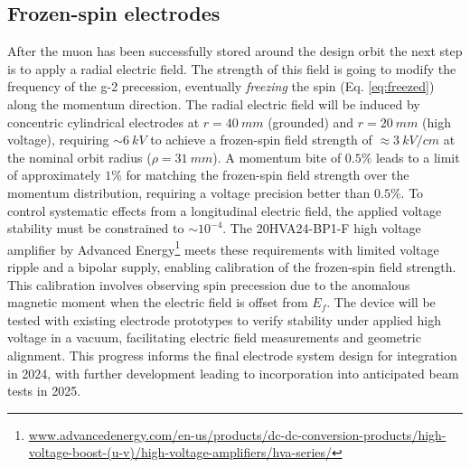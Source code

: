 \begin{refsection}
    \subsection{Frozen-spin electrodes}
        After the muon has been successfully stored around the design orbit the next step is to apply a radial electric field. 
        The strength of this field is going to modify the frequency of the g-2 precession, eventually \textit{freezing} the spin (Eq. \ref{eq:freezed}) along the momentum direction.
        The radial electric field will be induced by concentric cylindrical electrodes at $r=\SI{40}{mm}$ (grounded) and $r=\SI{20}{mm}$ (high voltage), requiring $\sim\SI{6}{kV}$ to achieve a frozen-spin field strength of $\approx\SI{3}{kV\per cm}$ at the nominal orbit radius ($\rho=\SI{31}{mm}$).
        A momentum bite of $0.5\%$ leads to a limit of approximately $1\%$ for matching the frozen-spin field strength over the momentum distribution, requiring a voltage precision better than $0.5\%$. 
        To control systematic effects from a longitudinal electric field, the applied voltage stability must be constrained to $\sim10^{-4}$.
        The 20HVA24-BP1-F high voltage amplifier by Advanced Energy\footnote{\url{www.advancedenergy.com/en-us/products/dc-dc-conversion-products/high-voltage-boost-(u-v)/high-voltage-amplifiers/hva-series/}} meets these requirements with limited voltage ripple and a bipolar supply, enabling calibration of the frozen-spin field strength. 
        This calibration involves observing spin precession due to the anomalous magnetic moment when the electric field is offset from $E_f$. 
        The device will be tested with existing electrode prototypes to verify stability under applied high voltage in a vacuum, facilitating electric field measurements and geometric alignment. 
        This progress informs the final electrode system design for integration in 2024, with further development leading to incorporation into anticipated beam tests in 2025.


\end{refsection}

